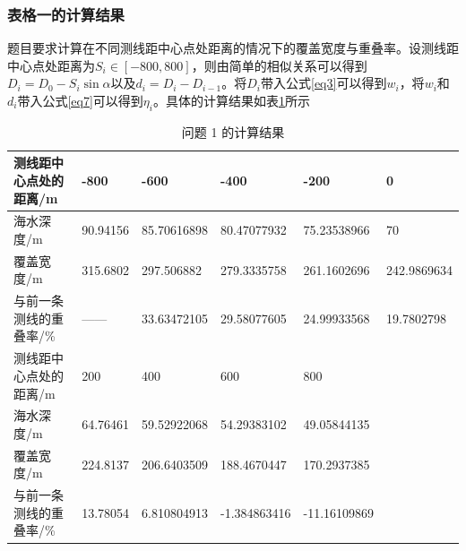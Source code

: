 \documentclass{article}
\begin{document}
\subsubsection{表格一的计算结果}
	\par 题目要求计算在不同测线距中心点处距离的情况下的覆盖宽度与重叠率。设测线距中心点处距离为$S_i\in[-800,800]$，则由简单的相似关系可以得到$D_i=D_0 - S_i\sin\alpha$以及$d_i = D_i-D_{i-1}$。将$D_i$带入公式\eqref{eq3}可以得到$w_i$，将$w_i$和$d_i$带入公式\eqref{eq7}可以得到$\eta_{i}$。具体的计算结果如表\ref{ansSheet1}所示

\begin{table}[]
	\caption{问题 1 的计算结果}\label{ansSheet1}
	\begin{tabular}{llllll}
		\hline
		测线距中心点处的距离/m  & -800     & -600        & -400         & -200         & \multicolumn{1}{l|}{0} \\ \hline
		海水深度/m        & 90.94156 & 85.70616898 & 80.47077932  & 75.23538966  & 70                     \\
		覆盖宽度/m        & 315.6802 & 297.506882  & 279.3335758  & 261.1602696  & 242.9869634            \\
		与前一条测线的重叠率/\% & ——       & 33.63472105 & 29.58077605  & 24.99933568  & 19.7802798             \\ \hline
		测线距中心点处的距离/m  & 200      & 400         & 600          & 800          &                        \\ \hline
		海水深度/m        & 64.76461 & 59.52922068 & 54.29383102  & 49.05844135  &                        \\
		覆盖宽度/m        & 224.8137 & 206.6403509 & 188.4670447  & 170.2937385  &                        \\
		与前一条测线的重叠率/\% & 13.78054 & 6.810804913 & -1.384863416 & -11.16109869 &                        \\ \hline
	\end{tabular}
\end{table}
\newpage
\end{document}
